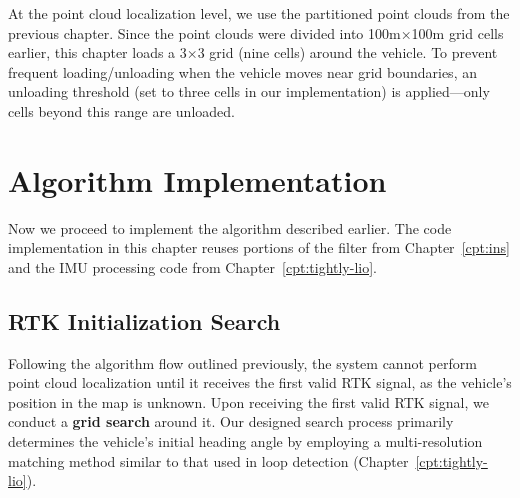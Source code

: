 At the point cloud localization level, we use the partitioned point clouds from the previous chapter. Since the point clouds were divided into 100m×100m grid cells earlier, this chapter loads a 3×3 grid (nine cells) around the vehicle. To prevent frequent loading/unloading when the vehicle moves near grid boundaries, an unloading threshold (set to three cells in our implementation) is applied—only cells beyond this range are unloaded.

\section{Algorithm Implementation}  
Now we proceed to implement the algorithm described earlier. The code implementation in this chapter reuses portions of the filter from Chapter~\ref{cpt:ins} and the IMU processing code from Chapter~\ref{cpt:tightly-lio}.  

\subsection{RTK Initialization Search}  
Following the algorithm flow outlined previously, the system cannot perform point cloud localization until it receives the first valid RTK signal, as the vehicle's position in the map is unknown. Upon receiving the first valid RTK signal, we conduct a \textbf{grid search} around it. Our designed search process primarily determines the vehicle's initial heading angle by employing a multi-resolution matching method similar to that used in loop detection (Chapter~\ref{cpt:tightly-lio}).  

